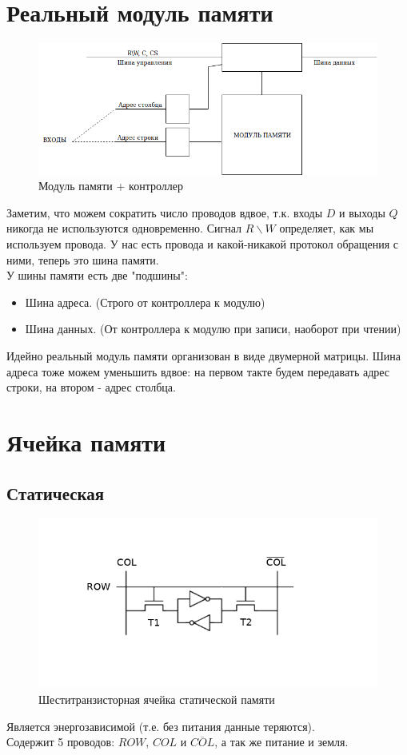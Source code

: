 \documentclass[12pt, a4paper]{article}
\begin{document}
\section{Реальный модуль памяти}
\begin{figure}[h]
    \centering
    \includegraphics[scale=0.5]{./images/MEM.png}
    \caption{Модуль памяти + контроллер}
    \label{fig:MEM}
\end{figure}
Заметим, что можем сократить число проводов вдвое, т.к. входы $D$ и выходы $Q$ никогда не используются одновременно. Сигнал $R\backslash W$ определяет, как мы используем провода. У нас есть провода и какой-никакой протокол обращения с ними, теперь это шина памяти.\\
У шины памяти есть две "подшины":
\begin{itemize}
    \item Шина адреса. (Строго от контроллера к модулю)
    \item Шина данных. (От контроллера к модулю при записи, наоборот при чтении)
\end{itemize}
Идейно реальный модуль памяти организован в виде двумерной матрицы. Шина адреса тоже можем уменьшить вдвое: на первом такте будем передавать адрес строки, на втором - адрес столбца.
\section{Ячейка памяти}
\subsection{Статическая}
\begin{figure}[h]
    \centering
    \includegraphics[scale=0.5]{./images/SRAM.png}
    \caption{Шеститранзисторная ячейка статической памяти}
    \label{fig:SRAM}
\end{figure}
Является энергозависимой (т.е. без питания данные теряются).\\
Содержит 5 проводов: $ROW$, $COL$ и $\overline{COL}$, а так же питание и земля.
\end{document}
